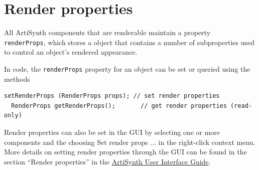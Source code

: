 
%
%


\section{Render properties}
\label{RenderProperties:sec}

All ArtiSynth components that are renderable maintain a property {\tt
renderProps}, which stores a
 object that contains a number
of subproperties used to control an object's rendered appearance.

In code, the {\tt renderProps} property for an object can be set or
queried using the methods
%
\begin{lstlisting}[]
  setRenderProps (RenderProps props); // set render properties
  RenderProps getRenderProps();       // get render properties (read-only)
\end{lstlisting}
%
Render properties can also be set in the GUI by selecting one or more
components and the choosing {\sf Set render props ...}  in the
right-click context menu. More details on setting render properties
through the GUI can be found in the section ``Render properties'' in the
\href{\artisynthDocBase/html/uiguide/uiguide.html}{%
ArtiSynth User Interface Guide}.

